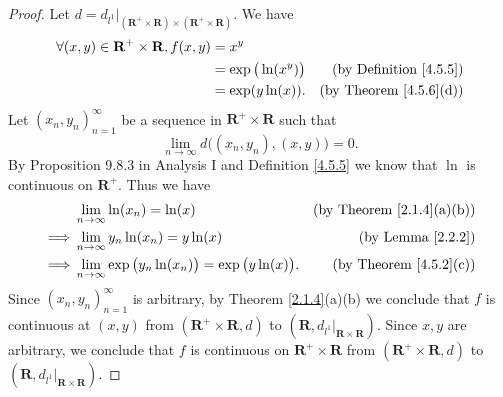 \begin{proof}
    Let \(d = d_{l^1}|_{(\mathbf{R}^+ \times \mathbf{R}) \times (\mathbf{R}^+ \times \mathbf{R})}\).
    We have
    \begin{align*}
        \forall (x, y) \in \mathbf{R}^+ \times \mathbf{R}, f(x, y) & = x^y                                                         \\
                                                                   & = \exp\big(\ln(x^y)\big) & \text{(by Definition \ref{4.5.5})} \\
                                                                   & = \exp(y \ln(x)).        & \text{(by Theorem \ref{4.5.6}(d))}
    \end{align*}
    Let \((x_n, y_n)_{n = 1}^\infty\) be a sequence in \(\mathbf{R}^+ \times \mathbf{R}\) such that
    \[
        \lim_{n \to \infty} d\big((x_n, y_n), (x, y)\big) = 0.
    \]
    By Proposition 9.8.3 in Analysis I and Definition \ref{4.5.5} we know that \(\ln\) is continuous on \(\mathbf{R}^+\).
    Thus we have
    \begin{align*}
                 & \lim_{n \to \infty} \ln(x_n) = \ln(x)                                    & \text{(by Theorem \ref{2.1.4}(a)(b))} \\
        \implies & \lim_{n \to \infty} y_n \ln(x_n) = y \ln(x)                              & \text{(by Lemma \ref{2.2.2})}         \\
        \implies & \lim_{n \to \infty} \exp\big(y_n \ln(x_n)\big) = \exp\big(y \ln(x)\big). & \text{(by Theorem \ref{4.5.2}(c))}
    \end{align*}
    Since \((x_n, y_n)_{n = 1}^\infty\) is arbitrary, by Theorem \ref{2.1.4}(a)(b) we conclude that \(f\) is continuous at \((x, y)\) from \((\mathbf{R}^+ \times \mathbf{R}, d)\) to \((\mathbf{R}, d_{l^1}|_{\mathbf{R} \times \mathbf{R}})\).
    Since \(x, y\) are arbitrary, we conclude that \(f\) is continuous on \(\mathbf{R}^+ \times \mathbf{R}\) from \((\mathbf{R}^+ \times \mathbf{R}, d)\) to \((\mathbf{R}, d_{l^1}|_{\mathbf{R} \times \mathbf{R}})\).
\end{proof}